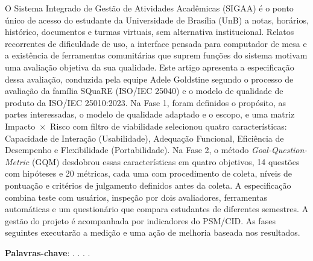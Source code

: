 \begin{resumo}
O Sistema Integrado de Gestão de Atividades Acadêmicas (SIGAA) é o ponto único de acesso do estudante da Universidade de Brasília (UnB) a notas, horários, histórico, documentos e turmas virtuais, sem alternativa institucional. Relatos recorrentes de dificuldade de uso, a interface pensada para computador de mesa e a existência de ferramentas comunitárias que suprem funções do sistema motivam uma avaliação objetiva da sua qualidade. Este artigo apresenta a especificação dessa avaliação, conduzida pela equipe Adele Goldstine segundo o processo de avaliação da família SQuaRE (ISO/IEC 25040) e o modelo de qualidade de produto da ISO/IEC 25010:2023. Na Fase 1, foram definidos o propósito, as partes interessadas, o modelo de qualidade adaptado e o escopo, e uma matriz Impacto~$\times$~Risco com filtro de viabilidade selecionou quatro características: Capacidade de Interação (Usabilidade), Adequação Funcional, Eficiência de Desempenho e Flexibilidade (Portabilidade). Na Fase 2, o método \textit{Goal-Question-Metric} (GQM) desdobrou essas características em quatro objetivos, 14 questões com hipóteses e 20 métricas, cada uma com procedimento de coleta, níveis de pontuação e critérios de julgamento definidos antes da coleta. A especificação combina teste com usuários, inspeção por dois avaliadores, ferramentas automáticas e um questionário que compara estudantes de diferentes semestres. A gestão do projeto é acompanhada por indicadores do PSM/CID. As fases seguintes executarão a medição e uma ação de melhoria baseada nos resultados.

\vspace{\onelineskip}
\noindent
\textbf{Palavras-chave}: \imprimirpalavrachaveum. \imprimirpalavrachavedois. \imprimirpalavrachavetres. \imprimirpalavrachavequatro.
\end{resumo}
